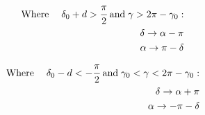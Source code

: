 %
\begin{eqnarray}
        \mathrm{Where}&\;& \delta_0+d>\cfrac{\pi}{2} \; \mathrm{and}\; \gamma>2\pi-\gamma_0:\nonumber\\
        & & \delta\rightarrow\alpha-\pi\nonumber\\
        & & \alpha\rightarrow\pi-\delta\nonumber\\
\end{eqnarray}
%
\begin{eqnarray}
        \mathrm{Where}&\;& \delta_0-d<-\cfrac{\pi}{2} \; \mathrm{and}\; \gamma_0<\gamma<2\pi-\gamma_0:\nonumber\\
        & & \delta\rightarrow\alpha+\pi\nonumber\\
        & & \alpha\rightarrow-\pi-\delta\nonumber\\
\end{eqnarray}

